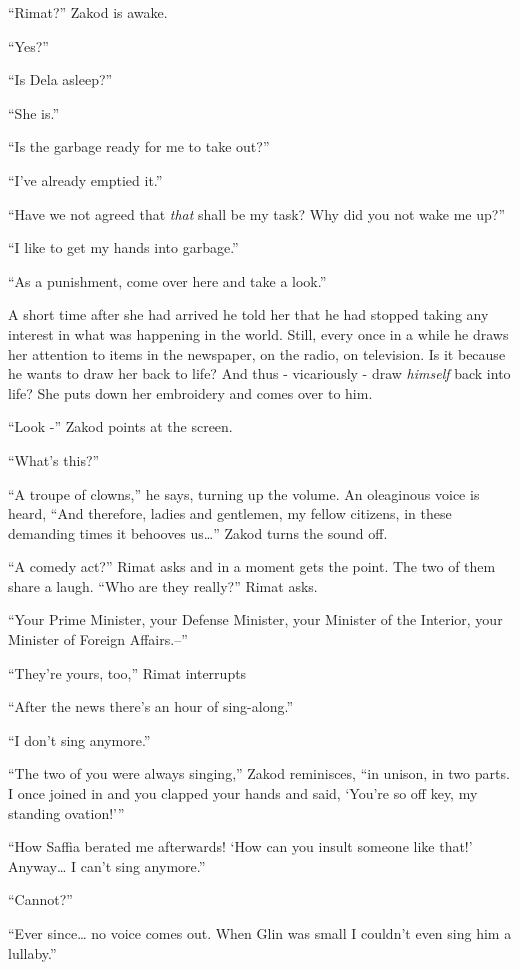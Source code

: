 \documentclass[twoside,11pt]{book}
\begin{document}
``Rimat?'' Zakod is awake.

``Yes?''

``Is Dela asleep?''

``She is.''

``Is the garbage ready for me to take out?''

``I've already emptied it.''

``Have we not agreed that \textit{that} shall be my task? Why did you not wake me up?''

``I like to get my hands into garbage.''

``As a punishment, come over here and take a look.''

A short time after she had arrived he told her that he had stopped taking any interest in what was happening in the
world. Still, every once in a while he draws her attention to items in the newspaper, on the radio, on television. Is
it because he wants to draw her back to life? And thus - vicariously - draw \textit{himself} back into life? She puts
down her embroidery and comes over to him.

``Look -'' Zakod points at the screen.

``What's this?''

``A troupe of clowns,'' he says, turning up the volume. An oleaginous voice is heard,
``And therefore, ladies and gentlemen, my fellow citizens, in these demanding times it behooves
us{\dots}'' Zakod turns the sound off.

``A comedy act?'' Rimat asks and in a moment gets the point. The two of them share a laugh.
``Who are they really?'' Rimat asks.

``Your Prime Minister, your Defense Minister, your Minister of the Interior, your Minister of Foreign
Affairs.--''

``They're yours, too,'' Rimat interrupts

``After the news there's an hour of sing-along.''

``I don't sing anymore.''

``The two of you were always singing,'' Zakod reminisces, ``in unison, in two
parts. I once joined in and you clapped your hands and said, `You're so off key, my standing ovation!'\thinspace''

``How Saffia berated me afterwards! `How can you insult someone like that!' Anyway{\dots} I can't sing
anymore.''

``Cannot?''

``Ever since{\dots}  no voice  comes out. When Glin was small I couldn't even sing him a
lullaby.''
\end{document}
